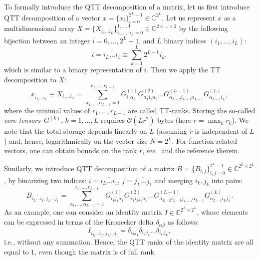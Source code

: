 \documentclass[a4paper]{article}
\newcommand{\LL}{L}
\begin{document}
To formally introduce the QTT decomposition of a matrix, let us first introduce QTT decomposition of a vector $x = \{x_i\}_{i=0}^{2^\LL-1}\in\mathbb{C}^{2^\LL}$. 
Let us represent $x$ as a multidimensional array $X = \{X_{i_1\dots i_\LL}\}_{i_1,\dots, i_\LL=0}^{1,\dots,1}\in\mathbb{C}^{2\times \dots \times 2}$ by the following bijection between an integer $i=0,\dots,2^\LL-1$, and $\LL$ binary indices $(i_1,\dots,i_\LL)$: 
\[
    i =\overline{i_\LL \dots i_1} \equiv \sum_{k = 1}^\LL 2^{\LL - k} i_k,
\]
which is similar to a binary representation of $i$.
Then we apply the TT decomposition to $X$:
\[
    x_{\overline{i_\LL \dots i_1}} \equiv X_{i_1\dots i_\LL} = \sum_{\alpha_1,\dots,\alpha_{\LL-1}=1}^{r_1,\dots,r_{\LL-1}} G_{i_1 \alpha_1}^{(1)} G_{\alpha_1 i_2 \alpha_2}^{(2)} \dots G_{\alpha_{\LL-2} i_{\LL-1} \alpha_{\LL-1}}^{(\LL-1)} G_{\alpha_{\LL-1} i_\LL}^{(\LL)},
\]
where the minimal values of $r_1,\dots,r_{\LL-1}$ are called TT-ranks.
Storing the so-called \emph{core tensors}~$G^{(k)}$, $k=1,\dots,\LL$ requires $\mathcal{O}(\LL r^2)$ bytes (here $r=\max_k r_k$).
{\color{blue} We note that the total storage depends linearly on $\LL$ (assuming $r$ is independent of $\LL$) and, hence, logarithmically on the vector size $N = 2^\LL$. For function-related vectors, one can obtain bounds on the rank $r$, see~\cite{khoromskij2018tensor} and the reference therein.} 

Similarly, we introduce QTT decomposition of a matrix $B = \{B_{i,j}\}_{i,j=0}^{2^\LL-1} \in\mathbb{C}^{2^\LL\times 2^\LL}$, by binarizing two indices: $i =\overline{i_\LL \dots i_1}$, $j =\overline{j_\LL \dots j_1}$ and merging $i_k,j_k$ into pairs: 
\begin{equation}\label{eq:tt_mat}
    B_{\overline{i_\LL \dots i_1}, \overline{j_\LL \dots j_1}} = 
    \sum_{\alpha_1,\dots,\alpha_{\LL-1}=1}^{r_1,\dots,r_{\LL-1}}
    G_{i_1 j_1 \alpha_1}^{(1)} G_{\alpha_1 i_2j_2 \alpha_2}^{(2)} \dots G_{\alpha_{\LL-2} i_{\LL-1}j_{\LL-1} \alpha_{\LL-1}}^{(\LL-1)} G_{\alpha_{\LL-1} i_\LL j_\LL}^{(\LL)}.
\end{equation}
As an example, one can consider an identity matrix $I\in\mathbb{C}^{2^\LL\times 2^\LL}$, whose elements can be expressed in terms of the Kronecker delta $\delta_{\alpha \beta}$ as follows:
\[
    I_{\overline{i_\LL \dots i_1}, \overline{j_\LL \dots j_1}} = \delta_{i_1 j_1} \delta_{i_2 j_2} \dots \delta_{i_\LL j_\LL},
\]
i.e., without any summation. Hence, the QTT ranks of the identity matrix are all equal to $1$, even though the matrix is of full rank.
\end{document}
